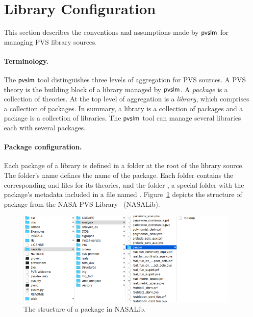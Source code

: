 \section{Library Configuration}
\label{sec.conf}

This section describes the conventions and assumptions made by
$\textsf{pvslm}$ for managing PVS library sources.

\paragraph{Terminology.}
The $\textsf{pvslm}$ tool distinguishes three levels of aggregation for PVS
sources. A PVS theory is the building block of a library managed by
$\textsf{pvslm}$. A {\em package} is a collection of theories. At the top
level of aggregation is a {\em library}, which comprises a collection
of packages. In summary, a library is a collection of packages and a
package is a collection of libraries. The $\textsf{pvslm}$ tool can manage
several libraries each with several packages.

\paragraph{Package configuration.}
Each package of a library is defined in a folder at the root of the
library source. The folder's name defines the name of the
package. Each folder contains the corresponding  and
 files for its theories, and the folder , a
special folder with the package's metadata included in a file named
. Figure~\ref{fig.package} depicts the structure of
package  from the NASA PVS Library~\cite{nasalib}
(NASALib).

\begin{figure}
  \centering
  \includegraphics[width=11cm]{images/package.png}
  \caption{The structure of a package  in NASALib.}
  \label{fig.package}
\end{figure}

